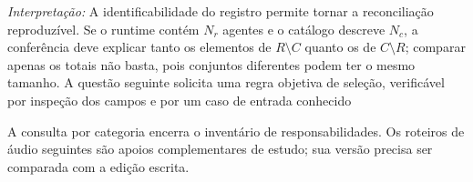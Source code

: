 \noindent\textit{Interpretação:} A identificabilidade do registro permite tornar a reconciliação reproduzível. Se o runtime contém $N_r$ agentes e o catálogo descreve $N_c$, a conferência deve explicar tanto os elementos de $R\setminus C$ quanto os de $C\setminus R$; comparar apenas os totais não basta, pois conjuntos diferentes podem ter o mesmo tamanho. A questão seguinte solicita uma regra objetiva de seleção, verificável por inspeção dos campos e por um caso de entrada conhecido 

A consulta por categoria encerra o inventário de responsabilidades. Os roteiros de áudio seguintes são apoios complementares de estudo; sua versão precisa ser comparada com a edição escrita.
